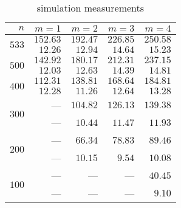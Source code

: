 \begin{table}[htb]
	\center
	\caption{simulation measurements}
	\label{tab:}
	\begin{tabular}{rrrrr}
		\hline
		$n$ & $m=1$ & $m=2$ & $m=3$ & $m=4$ \\
		\hline
		\hline
		\multirow{2}{*}{$533$}
		& $152.63$ & $192.47$ & $226.85$ & $250.58$ \\
		& $12.26$ & $12.94$ & $14.64$ & $15.23$ \\
		\hline
		\multirow{2}{*}{$500$}
		& $142.92$ & $180.17$ & $212.31$ & $237.15$ \\
		& $12.03$ & $12.63$ & $14.39$ & $14.81$ \\
		\hline
		\multirow{2}{*}{$400$}
		& $112.31$ & $138.81$ & $168.64$ & $184.81$ \\
		& $12.28$ & $11.26$ & $12.64$ & $13.28$ \\
		\hline
		\multirow{2}{*}{$300$}
		& --- & $104.82$ & $126.13$ & $139.38$ \\
		& --- & $10.44$ & $11.47$ & $11.93$ \\
		\hline
		\multirow{2}{*}{$200$}
		& --- & $66.34$ & $78.83$ & $89.46$ \\
		& --- & $10.15$ & $9.54$ & $10.08$ \\
		\hline
		\multirow{2}{*}{$100$}
		& --- & --- & --- & $40.45$ \\
		& --- & --- & --- & $9.10$ \\
		\hline
	\end{tabular}
\end{table}